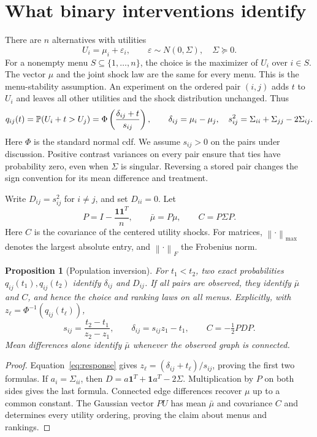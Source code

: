 \documentclass[11pt]{amsart}
\newtheorem{proposition}[theorem]{Proposition}
\theoremstyle{definition}\newtheorem{example}[theorem]{Example}
\theoremstyle{remark}\newtheorem{remark}[theorem]{Remark}
\newcommand{\one}{\mathbf 1}\newcommand{\diag}{\operatorname{diag}}
\newcommand{\norm}[1]{\left\lVert#1\right\rVert}
\begin{document}
\section{What binary interventions identify}\label{sec:population}
There are $n$ alternatives with utilities
\begin{equation}\label{eq:model}
 U_i=\mu_i+\varepsilon_i,\qquad \varepsilon\sim N(0,\Sigma),\quad \Sigma\succeq0.
\end{equation}
For a nonempty menu $S\subseteq\{1,\ldots,n\}$, the choice is the maximizer of $U_i$ over $i\in S$. The vector $\mu$ and the joint shock law are the same for every menu. This is the menu-stability assumption. An experiment on the ordered pair $(i,j)$ adds $t$ to $U_i$ and leaves all other utilities and the shock distribution unchanged. Thus
\begin{equation}\label{eq:response}
 q_{ij}(t)=\mathbb P(U_i+t>U_j)
 =\Phi\left(\frac{\delta_{ij}+t}{s_{ij}}\right),\qquad
 \delta_{ij}=\mu_i-\mu_j,\quad s_{ij}^2=\Sigma_{ii}+\Sigma_{jj}-2\Sigma_{ij}.
\end{equation}
Here $\Phi$ is the standard normal cdf. We assume $s_{ij}>0$ on the pairs under discussion. Positive contrast variances on every pair ensure that ties have probability zero, even when $\Sigma$ is singular. Reversing a stored pair changes the sign convention for its mean difference and treatment.

Write $D_{ij}=s_{ij}^2$ for $i\ne j$, and set $D_{ii}=0$. Let
\[
 P=I-\frac{\one\one^T}{n},\qquad \bar\mu=P\mu,\qquad C=P\Sigma P.
\]
Here $C$ is the covariance of the centered utility shocks. For matrices, $\norm{\cdot}_{\max}$ denotes the largest absolute entry, and $\norm{\cdot}_F$ the Frobenius norm.

\begin{proposition}[Population inversion]\label{prop:population}
For $t_1<t_2$, two exact probabilities $q_{ij}(t_1),q_{ij}(t_2)$ identify $\delta_{ij}$ and $D_{ij}$. If all pairs are observed, they identify $\bar\mu$ and $C$, and hence the choice and ranking laws on all menus. Explicitly, with $z_\ell=\Phi^{-1}(q_{ij}(t_\ell))$,
\begin{equation}\label{eq:inverse}
 s_{ij}=\frac{t_2-t_1}{z_2-z_1},\qquad
 \delta_{ij}=s_{ij}z_1-t_1,\qquad C=-\tfrac12 PDP.
\end{equation}
Mean differences alone identify $\bar\mu$ whenever the observed graph is connected.
\end{proposition}
\begin{proof}
Equation~\eqref{eq:response} gives $z_\ell=(\delta_{ij}+t_\ell)/s_{ij}$, proving the first two formulas. If $a_i=\Sigma_{ii}$, then $D=a\one^T+\one a^T-2\Sigma$. Multiplication by $P$ on both sides gives the last formula. Connected edge differences recover $\mu$ up to a common constant. The Gaussian vector $PU$ has mean $\bar\mu$ and covariance $C$ and determines every utility ordering, proving the claim about menus and rankings.
\end{proof}
\end{document}

